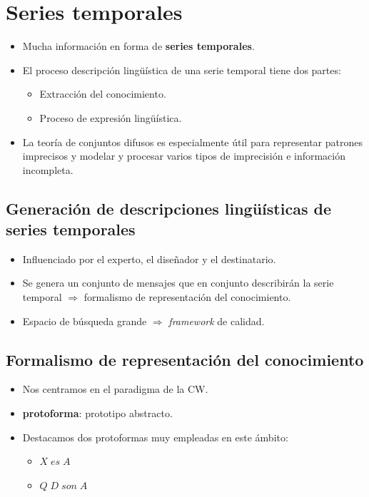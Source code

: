 \documentclass{beamer}
\begin{document}
	\section{Series temporales}
	
	\begin{frame}
		\begin{itemize}
			\item Mucha información en forma de \textbf{series temporales}.
		
			\item El proceso descripción lingüística de una serie temporal tiene dos partes:
				\begin{itemize}
					\item Extracción del conocimiento.
					\item Proceso de expresión lingüística.
				\end{itemize}
				
			\item La teoría de conjuntos difusos es especialmente útil para representar patrones imprecisos y modelar y procesar varios tipos de imprecisión e información incompleta.
		\end{itemize}
	\end{frame}
	
	\subsection{Generación de descripciones lingüísticas de series temporales}
	
	\begin{frame}
		\begin{itemize}
			\item Influenciado por el experto, el diseñador y el destinatario.
			\item Se genera un conjunto de mensajes que en conjunto describirán la serie temporal $\Rightarrow$ formalismo de representación del conocimiento.
			\item Espacio de búsqueda grande $\Rightarrow$ \textit{framework} de calidad.
		\end{itemize}
	\end{frame}
	
	\subsection{Formalismo de representación del conocimiento}
	
	\begin{frame}
		\begin{itemize}
			\item Nos centramos en el paradigma de la CW.
			\item \textbf{protoforma}: prototipo abstracto.
			\item Destacamos dos protoformas muy empleadas en este ámbito:
				\begin{itemize}
					\item $X \; es \; A$
					\item $Q \; D \; son \; A$
				\end{itemize}
		\end{itemize}
	\end{frame}
	
\end{document}
